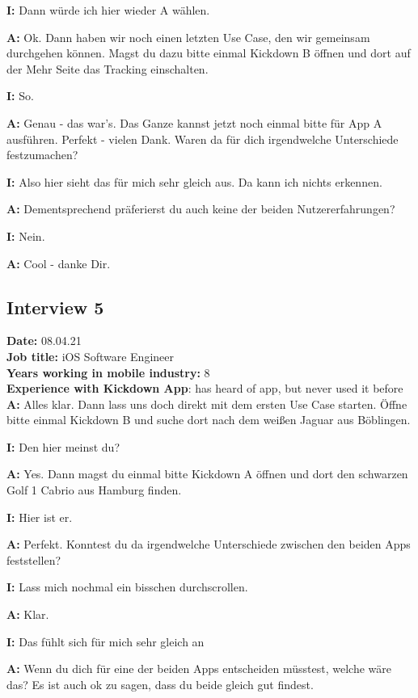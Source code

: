 \begin{myparindent}{0pt}
\textbf{I:} Dann würde ich hier wieder A wählen. 

\textbf{A:} Ok. Dann haben wir noch einen letzten Use Case, den wir gemeinsam durchgehen können. Magst du dazu bitte einmal Kickdown B öffnen und dort auf der Mehr Seite das Tracking einschalten. 

\textbf{I:} So.

\textbf{A:} Genau - das war's. Das Ganze kannst jetzt noch einmal bitte für App A ausführen. Perfekt - vielen Dank. Waren da für dich irgendwelche Unterschiede festzumachen?

\textbf{I:} Also hier sieht das für mich sehr gleich aus. Da kann ich nichts erkennen. 

\textbf{A:} Dementsprechend präferierst du auch keine der beiden Nutzererfahrungen?

\textbf{I:} Nein. 

\textbf{A:} Cool - danke Dir.


\subsection{Interview 5}
\textbf{Date:} 08.04.21\\
\textbf{Job title:} iOS Software Engineer\\
\textbf{Years working in mobile industry:} 8\\
\textbf{Experience with Kickdown App}: has heard of app, but never used it before\\

\textbf{A:} Alles klar. Dann lass uns doch direkt mit dem ersten Use Case starten. Öffne bitte einmal Kickdown B und suche dort nach dem weißen Jaguar aus Böblingen. 

\textbf{I:} Den hier meinst du?

\textbf{A:} Yes. Dann magst du einmal bitte Kickdown A öffnen und dort den schwarzen Golf 1 Cabrio aus Hamburg finden.

\textbf{I:} Hier ist er. 

\textbf{A:} Perfekt. Konntest du da irgendwelche Unterschiede zwischen den beiden Apps feststellen?

\textbf{I:} Lass mich nochmal ein bisschen durchscrollen. 

\textbf{A:} Klar. 

\textbf{I:} Das fühlt sich für mich sehr gleich an

\textbf{A:} Wenn du dich für eine der beiden Apps entscheiden müsstest, welche wäre das? Es ist auch ok zu sagen, dass du beide gleich gut findest. 


\end{myparindent}
